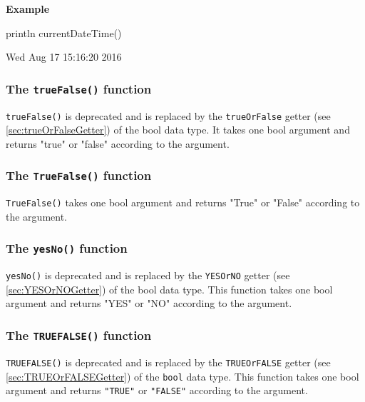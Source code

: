 \documentclass[10pt,openright,twosides,final]{memoir}
\newcommand{\gtltype}[1]{{\small\ttfamily #1}}
\newcommand{\scst}[1]{{\footnotesize\ttfamily\colorbox{light-blue}{"#1"}}}
\newcommand{\gtlinline}[1]{\colorbox{light-blue}{\lstinline[language=gtl]{#1}}}
\newcommand{\example}{\vspace{.75em}\noindent\textbf{Example}\vspace{0em}}
\begin{document}
\example
\begin{gtl}
println currentDateTime()
\end{gtl}
\begin{console}
Wed Aug 17 15:16:20 2016
\end{console}

\subsubsection{The \texttt{trueFalse()} function}

\gtlinline{trueFalse()} is deprecated and is replaced by the \gtlinline{trueOrFalse} getter (see \ref{sec:trueOrFalseGetter}) of the \gtltype{bool} data type. It takes one bool argument and returns \scst{true} or \scst{false} according to the argument.

\subsubsection{The \texttt{TrueFalse()} function}

\gtlinline{TrueFalse()} takes one bool argument and returns \scst{True} or \scst{False} according to the argument.

\subsubsection{The \texttt{yesNo()} function}

\gtlinline{yesNo()} is deprecated and is replaced by the \gtlinline{YESOrNO} getter (see \ref{sec:YESOrNOGetter}) of the \gtltype{bool} data type. This function takes one bool argument and returns \scst{YES} or \scst{NO} according to the argument.

\subsubsection{The \texttt{TRUEFALSE()} function}

\gtlinline{TRUEFALSE()} is deprecated and is replaced by the \texttt{TRUEOrFALSE} getter (see \ref{sec:TRUEOrFALSEGetter})  of the \texttt{bool} data type. This function takes one bool argument and returns \texttt{"TRUE"} or \texttt{"FALSE"} according to the argument.
\end{document}
